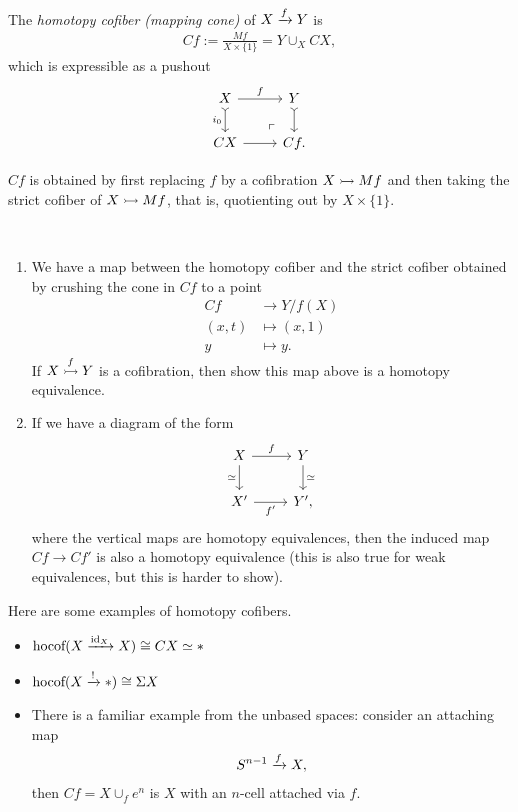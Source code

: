 \documentclass{article}[11pt]
\begin{document}
\begin{definition} The \textit{homotopy cofiber (mapping cone)} of $X\xrightarrow{f} Y$ is
\begin{align*}
	Cf := \frac{Mf}{X\times \{1\}} = Y\cup_X CX,
\end{align*}
which is expressible as a pushout
\[
	\begin{tikzcd}
	X\rar["f" above]\dar[tail,"i_0" left] & Y\dar[tail] \\
	CX\rar & Cf.\po
	\end{tikzcd}
\]
\end{definition}

\begin{note} $Cf$ is obtained by first replacing $f$ by a cofibration $X\rightarrowtail Mf$ and then taking the strict cofiber of $X\rightarrowtail Mf$, that is, quotienting out by $X\times\{1\}$.
\end{note}

\begin{exercise} $\ $
\begin{enumerate}
	\item We have a map between the homotopy cofiber and the strict cofiber obtained by crushing the cone in $Cf$ to a point
	\begin{align*}
		Cf &\to Y/f(X) \\
		(x,t) &\mapsto (x,1) \\
		y &\mapsto y.
	\end{align*}
	If $X\overset{f}{\rightarrowtail} Y$ is a cofibration, then show this map above is a homotopy equivalence.

	\item If we have a diagram of the form
	\[
		\begin{tikzcd}
		X\rar["f" above]\dar["\simeq" left] & Y\dar["\simeq" right] \\
		X'\rar["f'" below] & Y',
		\end{tikzcd}
	\]
	where the vertical maps are homotopy equivalences, then the induced map $Cf \to Cf'$ is also a homotopy equivalence (this is also true for weak equivalences, but this is harder to show).
\end{enumerate}
\end{exercise}

\begin{examples}Here are some examples of homotopy cofibers.
\vspace{-10pt}

\begin{itemize}\itemsep0em
	\item $\text{hocof}(X \xrightarrow{\text{id}_X} X) \cong CX \simeq \ast$
	\item $\text{hocof}(X \xrightarrow{!} \ast) \cong \Sigma X$
	\item There is a familiar example from the unbased spaces: consider an attaching map
	\begin{align*}
		S^{n-1} \xrightarrow{f} X,
	\end{align*}
	then $Cf = X\cup_f e^n$ is $X$ with an $n$-cell attached via $f$.
\end{itemize}
\end{examples}
\end{document}
